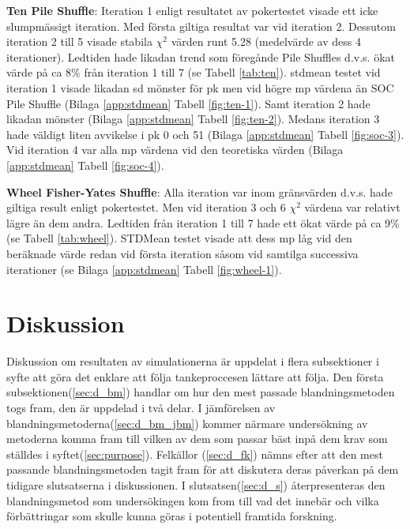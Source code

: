 \documentclass[swedish,a4paper]{article}
\begin{document}
\textbf{Ten Pile Shuffle}: Iteration 1 enligt resultatet av pokertestet visade
ett icke slumpmässigt iteration. Med första giltiga resultat var vid iteration
2. Dessutom iteration 2 till 5 visade stabila $\chi^2$ värden runt 5.28
(medelvärde av dess 4 iterationer). Ledtiden hade likadan trend som föregånde
Pile Shuffles d.v.s. ökat värde på ca 8\% från iteration 1 till 7 (se Tabell
\ref{tab:ten}). \gls{stdmean} testet vid iteration 1 visade likadan \gls{sd}
mönster för \gls{pk} men vid högre \gls{mp} värdena än SOC Pile Shuffle (Bilaga
\ref{app:stdmean} Tabell \ref{fig:ten-1}). Samt iteration 2 hade likadan mönster
(Bilaga \ref{app:stdmean} Tabell \ref{fig:ten-2}). Medans iteration 3 hade
väldigt liten avvikelse i \gls{pk} 0 och 51 (Bilaga \ref{app:stdmean} Tabell
\ref{fig:soc-3}). Vid iteration 4 var alla \gls{mp} värdena vid den teoretiska
värden (Bilaga \ref{app:stdmean} Tabell \ref{fig:soc-4}).


\textbf{Wheel Fisher-Yates Shuffle}: Alla iteration var inom gränsvärden d.v.s.
hade giltiga result enligt pokertestet. Men vid iteration 3 och 6 $\chi^2$
värdena var relativt lägre än dem andra. Ledtiden från iteration 1 till 7 hade
ett ökat värde på ca 9\% (se Tabell \ref{tab:wheel}). STDMean testet visade att
dess \gls{mp} låg vid den beräknade värde redan vid första iteration såsom vid
samtilga successiva iterationer (se Bilaga \ref{app:stdmean} Tabell
\ref{fig:wheel-1}). 



\section{Diskussion}
Diskussion om resultaten av simulationerna är uppdelat i flera subsektioner i
syfte att göra det enklare att följa tankeproccesen lättare att följa. Den
första subsektionen(\ref{sec:d_bm}) handlar om hur den mest passade blandningsmetoden
togs fram, den är uppdelad i två delar. I jämförelsen av blandningsmetoderna(\ref{sec:d_bm_jbm}) kommer närmare undersökning av metoderna komma fram till vilken av dem som passar
bäst inpå dem krav som ställdes i syftet(\ref{sec:purpose}). Felkällor (\ref{sec:d_fk}) nämns efter att den mest passande blandningsmetoden tagit fram för att
diskutera deras påverkan på dem tidigare slutsatserna i diskussionen. I slutsatsen(\ref{sec:d_s}) återpresenteras den blandningsmetod som undersökingen kom from till vad det
innebär och vilka förbättringar som skulle kunna göras i potentiell framtida
forskning.
\end{document}
